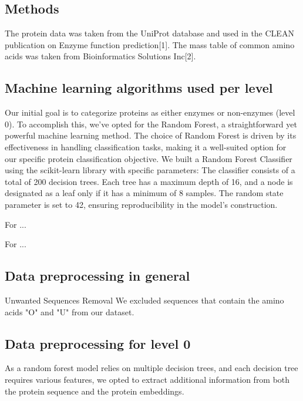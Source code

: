 \documentclass{bioinfo}
\begin{document}
\begin{methods}
\section{Methods}
The protein data was taken from the UniProt database and used in the CLEAN publication on Enzyme function prediction[1]. %
The mass table of common amino acids was taken from Bioinformatics Solutions Inc[2]. %

\subsection{Machine learning algorithms used per level}

Our initial goal is to categorize proteins as either enzymes or non-enzymes (level 0). 
To accomplish this, we've opted for the Random Forest, a straightforward yet powerful machine learning method.
The choice of Random Forest is driven by its effectiveness in handling classification tasks, making it a well-suited option for our specific protein classification objective.
We built a Random Forest Classifier using the scikit-learn library with specific parameters: The classifier consists of a total of 200 decision trees.
Each tree has a maximum depth of 16, and a node is designated as a leaf only if it has a minimum of 8 samples.
The random state parameter is set to 42, ensuring reproducibility in the model's construction.

For ... 

For ...

\subsection{Data preprocessing in general}
Unwanted Sequences Removal
We excluded sequences that contain the amino acids "O" and "U" from our dataset. 



\subsection{Data preprocessing for level 0}
As a random forest model relies on multiple decision trees, and each decision tree requires various features,
we opted to extract additional information from both the protein sequence and the protein embeddings.


\end{methods}
\end{document}
